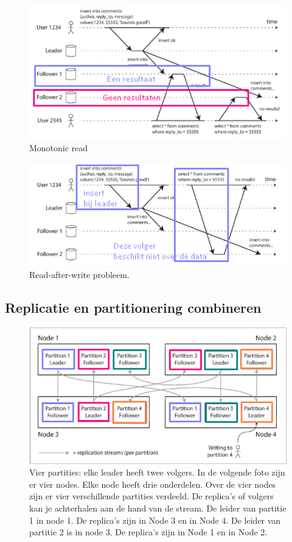 \documentclass[a4paper,10pt,twoside]{report}
\begin{document}
\begin{figure}
	\includegraphics[width=\linewidth]{../images/Screenshot_213.png}
	\caption{Monotonic read}
\end{figure}

\begin{figure}
	\includegraphics[width=\linewidth]{../images/Screenshot_214.png}
	\caption{Read-after-write probleem.}
\end{figure}

\subsection{Replicatie en partitionering combineren}

\begin{figure}
	\includegraphics[width=\linewidth]{../images/Screenshot_215.png}
	\caption{Vier partities: elke leader heeft twee volgers. In de volgende foto zijn er vier nodes. Elke node heeft drie onderdelen. Over de vier nodes zijn er vier verschillende partities verdeeld. De replica's of volgers kan je achterhalen aan de hand van de stream. De leider van partitie 1 in node 1. De replica's zijn in Node 3 en in Node 4. De leider van partitie 2 is in node 3. De replica's zijn in Node 1 en in Node 2.}
\end{figure}
\end{document}
